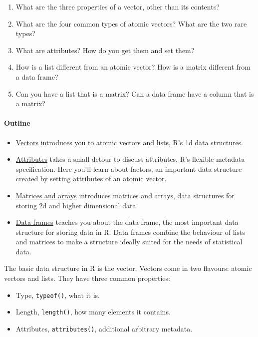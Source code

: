\begin{enumerate}
\def\labelenumi{\arabic{enumi}.}
\item
  What are the three properties of a vector, other than its contents?
\item
  What are the four common types of atomic vectors? What are the two
  rare types?
\item
  What are attributes? How do you get them and set them?
\item
  How is a list different from an atomic vector? How is a matrix
  different from a data frame?
\item
  Can you have a list that is a matrix? Can a data frame have a column
  that is a matrix?
\end{enumerate}

\paragraph{Outline}

\begin{itemize}
\item
  \hyperref[vectors]{Vectors} introduces you to atomic vectors and
  lists, R's 1d data structures.
\item
  \hyperref[attributes]{Attributes} takes a small detour to discuss
  attributes, R's flexible metadata specification. Here you'll learn
  about factors, an important data structure created by setting
  attributes of an atomic vector.
\item
  \hyperref[matrices-and-arrays]{Matrices and arrays} introduces
  matrices and arrays, data structures for storing 2d and higher
  dimensional data.
\item
  \hyperref[data-frames]{Data frames} teaches you about the data frame,
  the most important data structure for storing data in R. Data frames
  combine the behaviour of lists and matrices to make a structure
  ideally suited for the needs of statistical data.
\end{itemize}


The basic data structure in R is the vector. Vectors come in two
flavours: atomic vectors and lists. They have three common properties:

\begin{itemize}
\itemsep1pt\parskip0pt
\item
  Type, \texttt{typeof()}, what it is.
\item
  Length, \texttt{length()}, how many elements it contains.
\item
  Attributes, \texttt{attributes()}, additional arbitrary metadata.
\end{itemize}

